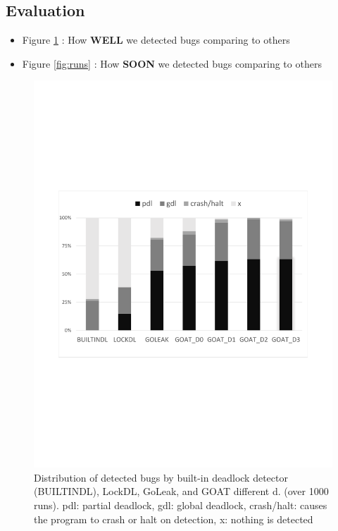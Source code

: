 \subsection{Evaluation}

\begin{itemize}
  \item Figure \ref{fig:detection} : How \textbf{WELL} we detected bugs comparing to others
  \item Figure \ref{fig:runs} : How \textbf{SOON} we detected bugs comparing to others
\end{itemize}



\begin{figure}
\centering
  \includegraphics[width=.95\linewidth]{figs/P4_detections.pdf}
  \caption{Distribution of detected bugs by built-in deadlock detector (BUILTINDL), LockDL, GoLeak, and GOAT different d. (over 1000 runs). pdl: partial deadlock, gdl: global deadlock, crash/halt: causes the program to crash or halt on detection, x: nothing is detected }
  \label{fig:detection}
\end{figure}



